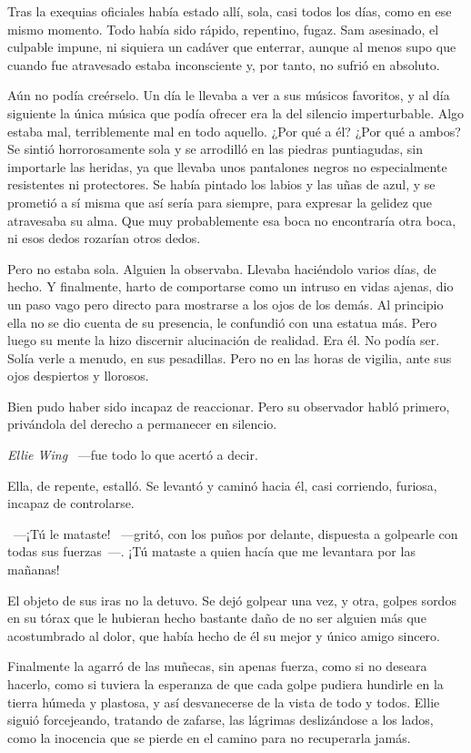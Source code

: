 Tras la exequias oficiales había estado allí, sola, casi todos los días, como en ese mismo momento. Todo había sido rápido, repentino, fugaz. Sam asesinado, el culpable impune, ni siquiera un cadáver que enterrar, aunque al menos supo que cuando fue atravesado estaba inconsciente y, por tanto, no sufrió en absoluto.

Aún no podía creérselo. Un día le llevaba a ver a sus músicos favoritos, y al día siguiente la única música que podía ofrecer era la del silencio imperturbable. Algo estaba mal, terriblemente mal en todo aquello. ¿Por qué a él? ¿Por qué a ambos? Se sintió horrorosamente sola y se arrodilló en las piedras puntiagudas, sin importarle las heridas, ya que llevaba unos pantalones negros no especialmente resistentes ni protectores. Se había pintado los labios y las uñas de azul, y se prometió a sí misma que así sería para siempre, para expresar la gelidez que atravesaba su alma. Que muy probablemente esa boca no encontraría otra boca, ni esos dedos rozarían otros dedos.

Pero no estaba sola. Alguien la observaba. Llevaba haciéndolo varios días, de hecho. Y finalmente, harto de comportarse como un intruso en vidas ajenas, dio un paso vago pero directo para mostrarse a los ojos de los demás. Al principio ella no se dio cuenta de su presencia, le confundió con una estatua más. Pero luego su mente la hizo discernir alucinación de realidad. Era él. No podía ser. Solía verle a menudo, en sus pesadillas. Pero no en las horas de vigilia, ante sus ojos despiertos y llorosos.

Bien pudo haber sido incapaz de reaccionar. Pero su observador habló primero, privándola del derecho a permanecer en silencio.

\emph{Ellie Wing} ~---fue todo lo que acertó a decir.

Ella, de repente, estalló. Se levantó y caminó hacia él, casi corriendo, furiosa, incapaz de controlarse.

~---¡Tú le mataste! ~---gritó, con los puños por delante, dispuesta a golpearle con todas sus fuerzas~---. ¡Tú mataste a quien hacía que me levantara por las mañanas!

El objeto de sus iras no la detuvo. Se dejó golpear una vez, y otra, golpes sordos en su tórax que le hubieran hecho bastante daño de no ser alguien más que acostumbrado al dolor, que había hecho de él su mejor y único amigo sincero.

Finalmente la agarró de las muñecas, sin apenas fuerza, como si no deseara hacerlo, como si tuviera la esperanza de que cada golpe pudiera hundirle en la tierra húmeda y plastosa, y así desvanecerse de la vista de todo y todos. Ellie siguió forcejeando, tratando de zafarse, las lágrimas deslizándose a los lados, como la inocencia que se pierde en el camino para no recuperarla jamás.

